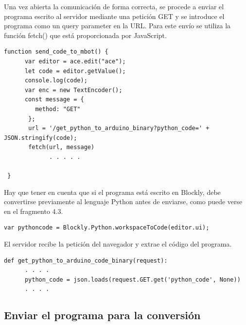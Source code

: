 \documentclass{report}
\begin{document}
Una vez abierta la comunicación de forma correcta, se procede a enviar el programa escrito al servidor mediante una petición GET y se introduce el programa como un query parameter en la URL. Para este envío se utiliza la función fetch() que está proporcionada por JavaScript.
\\
\begin{lstlisting}[frame=single,breaklines=true, label="Envio del programa desde el navegador al servidor", caption="Envio del programa desde el navegador al servidor", captionpos=b]
   function send_code_to_mbot() {
      var editor = ace.edit("ace");
      let code = editor.getValue();
      console.log(code);
      var enc = new TextEncoder();
      const message = {
         method: "GET"
       };
       url = '/get_python_to_arduino_binary?python_code=' + JSON.stringify(code);
       fetch(url, message)
             . . . . .
  
 }
\end{lstlisting}
Hay que tener en cuenta que si el programa está escrito en Blockly, debe convertirse previamente al lenguaje Python antes de enviarse, como puede verse en el fragmento 4.3.
\\
\begin{lstlisting}[frame=single,breaklines=true, label="Conversion de Blockly a Python", caption="Conversion de Blockly a Python", captionpos=b]
   var pythoncode = Blockly.Python.workspaceToCode(editor.ui);
\end{lstlisting}
El servidor recibe la petición del navegador y extrae el código del programa.
\\
\begin{lstlisting}[frame=single,breaklines=true, label="Extraccion del programa en el servidor", caption="Extraccion programa en el servidor", captionpos=b]
   def get_python_to_arduino_code_binary(request):
      . . . .
      python_code = json.loads(request.GET.get('python_code', None))
      . . . .

\end{lstlisting}

\subsection{Enviar el programa para la conversión}
\end{document}
